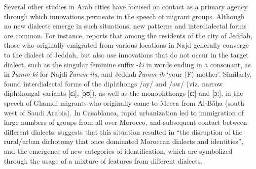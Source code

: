 \documentclass[output=paper]{langsci/langscibook}
\begin{document}
Several other studies in Arab cities have focused on contact as a primary agency through which innovations permeate in the speech of migrant groups. Although no new dialects emerge in such situations, new patterns and interdialectal forms are common. For instance, \citet{Al-Essa2009} reports that among the residents of the city of Jeddah, those who originally emigrated from various locations in Najd generally converge to the dialect of Jeddah, but also use innovations that do not occur in the target dialect, such as the singular feminine suffix -\textit{ki} in words ending in a consonant, as in \textit{ʔumm-ki} for Najdi \textit{ʔumm-its}, and Jeddah \textit{ʔumm-ik} ‘your (\textsc{F}) mother’. Similarly, \citet{Al-Ghamdi2014} found interdialectal forms of the diphthongs /ay/ and /aw/ (viz. narrow diphthongal variants [ɛi], [ɔʊ]), as well as the monophthongs [ɛː] and [ɔː], in the speech of Ghamdi migrants who originally came to Mecca from Al-Bāḥa (south west of Saudi Arabia). In Casablanca, rapid urbanization led to immigration of large numbers of groups from all over Morocco, and subsequent contact between different dialects. \citet[97]{Hachimi2007} suggests that this situation resulted in “the disruption of the rural/urban dichotomy that once dominated Moroccan dialects and identities”, and the emergence of new categories of identification, which are symbolized through the usage of a mixture of features from different dialects.
\end{document}
